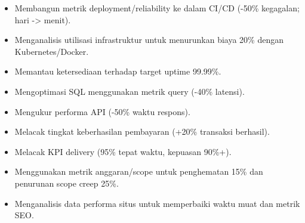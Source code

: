 \begin{itemize}
\item Membangun metrik deployment/reliability ke dalam CI/CD (-50\% kegagalan; hari -> menit).
\item Menganalisis utilisasi infrastruktur untuk menurunkan biaya 20\% dengan Kubernetes/Docker.
\item Memantau ketersediaan terhadap target uptime 99.99\%.
\end{itemize}
\divider

\begin{itemize}
\item Mengoptimasi SQL menggunakan metrik query (-40\% latensi).
\item Mengukur performa API (-50\% waktu respons).
\item Melacak tingkat keberhasilan pembayaran (+20\% transaksi berhasil).
\end{itemize}
\divider

\begin{itemize}
\item Melacak KPI delivery (95\% tepat waktu, kepuasan 90\%+).
\item Menggunakan metrik anggaran/scope untuk penghematan 15\% dan penurunan scope creep 25\%.
\end{itemize}
\divider

\begin{itemize}
\item Menganalisis data performa situs untuk memperbaiki waktu muat dan metrik SEO.
\end{itemize}

\newpage
\switchcolumn
